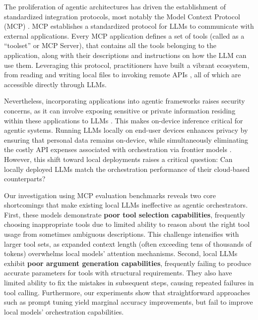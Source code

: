 The proliferation of agentic architectures has driven the establishment of standardized integration protocols, most notably the Model Context Protocol (MCP) \cite{anthropic_mcp_2024}. MCP establishes a standardized protocol for LLMs to communicate with external applications. Every MCP application defines a set of tools (called as a ``toolset'' or MCP Server), that contains all the tools belonging to the application, along with their descriptions and instructions on how the LLM can use them. Leveraging this protocol, practitioners have built a vibrant ecosystem, from reading and writing local files to invoking remote APIs \cite{mcp_servers_2025}, all of which are accessible directly through LLMs. 

Nevertheless, incorporating applications into agentic frameworks raises security concerns, as it can involve exposing sensitive or private information residing within these applications to LLMs \cite{hasan2025model, hou2025model, guo2025systematic}. This makes on-device inference critical for agentic systems. Running LLMs locally on end-user devices enhances privacy by ensuring that personal data remains on-device, while simultaneously eliminating the costly API expenses associated with orchestration via frontier models \cite{gu2025consumerbench}. However, this shift toward local deployments raises a critical question: Can locally deployed LLMs match the orchestration performance of their cloud-based counterparts?

Our investigation using MCP evaluation benchmarks \cite{wang2025mcp} reveals two core shortcomings that make existing local LLMs ineffective as agentic orchestrators. First, these models demonstrate \textbf{poor tool selection capabilities}, frequently choosing inappropriate tools due to limited ability to reason about the right tool usage from sometimes ambiguous descriptions. This challenge intensifies with larger tool sets, as expanded context length (often exceeding tens of thousands of tokens) overwhelms local models' attention mechanisms. Second, local LLMs exhibit \textbf{poor argument generation capabilities}, frequently failing to produce accurate parameters for tools with structural requirements. They also have limited ability to fix the mistakes in subsequent steps, causing repeated failures in tool calling. Furthermore, our experiments show that straightforward approaches such as prompt tuning yield marginal accuracy improvements, but fail to improve local models' orchestration capabilities. 

